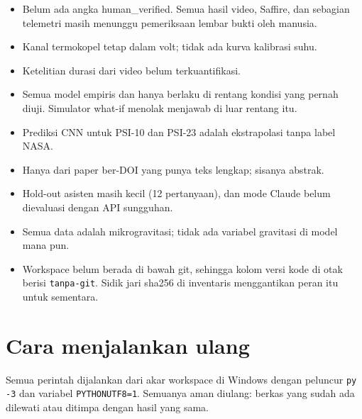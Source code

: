 \documentclass[11pt,a4paper]{report}
\newcommand{\tier}[1]{\textsf{\small #1}}
\begin{document}
\begin{itemize}
\item Belum ada angka \tier{human\_verified}. Semua hasil video, Saffire, dan sebagian telemetri
      masih menunggu pemeriksaan lembar bukti oleh manusia.
\item Kanal termokopel tetap dalam volt; tidak ada kurva kalibrasi suhu.
\item Ketelitian durasi dari video belum terkuantifikasi.
\item Semua model empiris dan hanya berlaku di rentang kondisi yang pernah diuji. Simulator what-if
      menolak menjawab di luar rentang itu.
\item Prediksi CNN untuk PSI-10 dan PSI-23 adalah ekstrapolasi tanpa label NASA.
\item Hanya \doiPdf{} dari \nPapersDoi{} paper ber-DOI yang punya teks lengkap; sisanya abstrak.
\item Hold-out asisten masih kecil (12 pertanyaan), dan mode Claude belum dievaluasi dengan API
      sungguhan.
\item Semua data adalah mikrogravitasi; tidak ada variabel gravitasi di model mana pun.
\item Workspace belum berada di bawah git, sehingga kolom versi kode di otak berisi
      \texttt{tanpa-git}. Sidik jari sha256 di inventaris menggantikan peran itu untuk sementara.
\end{itemize}

\chapter{Cara menjalankan ulang}\label{bab:jalan}

Semua perintah dijalankan dari akar workspace di Windows dengan peluncur \texttt{py -3} dan
variabel \texttt{PYTHONUTF8=1}. Semuanya aman diulang: berkas yang sudah ada dilewati atau
ditimpa dengan hasil yang sama.
\end{document}
